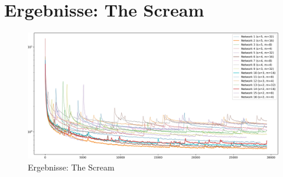 \section{Ergebnisse: The Scream}
\begin{figure}[H]
	\centering
	\includegraphics[width=1.00\textwidth]{resources/content/experiments/fast_loss_plot_experiment2.jpg}
	\caption{Ergebnisse: The Scream}
	\label{img:results_the_scream}
\end{figure}

